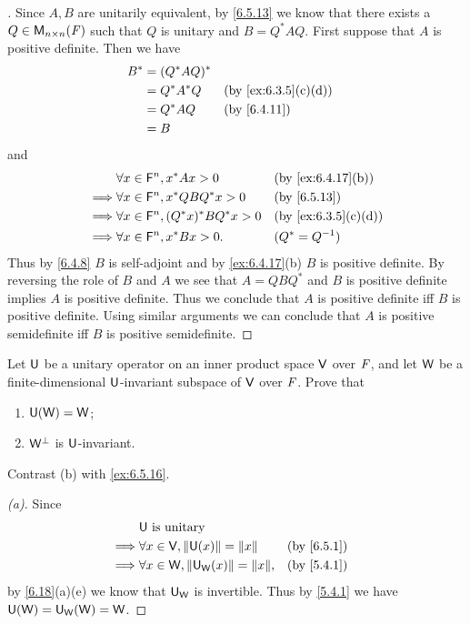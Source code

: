 \begin{proof}[]
  Since \(A, B\) are unitarily equivalent, by \cref{6.5.13} we know that there exists a \(Q \in \ms[n][n][\F]\) such that \(Q\) is unitary and \(B = Q^* A Q\).
  First suppose that \(A\) is positive definite.
  Then we have
  \begin{align*}
    B^* & = (Q^* A Q)^*                         \\
        & = Q^* A^* Q   &  & \by{ex:6.3.5}[c,d] \\
        & = Q^* A Q     &  & \by{6.4.11}        \\
        & = B
  \end{align*}
  and
  \begin{align*}
             & \forall x \in \vs{F}^n, x^* A x > 0           &  & \by{ex:6.4.17}[b]  \\
    \implies & \forall x \in \vs{F}^n, x^* Q B Q^* x > 0     &  & \by{6.5.13}        \\
    \implies & \forall x \in \vs{F}^n, (Q^* x)^* B Q^* x > 0 &  & \by{ex:6.3.5}[c,d] \\
    \implies & \forall x \in \vs{F}^n, x^* B x > 0.          &  & (Q^* = Q^{-1})
  \end{align*}
  Thus by \cref{6.4.8} \(B\) is self-adjoint and by \cref{ex:6.4.17}(b) \(B\) is positive definite.
  By reversing the role of \(B\) and \(A\) we see that \(A = Q B Q^*\) and \(B\) is positive definite implies \(A\) is positive definite.
  Thus we conclude that \(A\) is positive definite iff \(B\) is positive definite.
  Using similar arguments we can conclude that \(A\) is positive semidefinite iff \(B\) is positive semidefinite.
\end{proof}

\begin{ex}\label{ex:6.5.15}
  Let \(\mathsf{U}\) be a unitary operator on an inner product space \(\mathsf{V}\) over \(\mathit{F}\), and let \(\mathsf{W}\) be a finite-dimensional \(\mathsf{U}\)-invariant subspace of \(\mathsf{V}\) over \(\mathit{F}\).
  Prove that
  \begin{enumerate}
    \item \(\mathsf{U}(\mathsf{W}) = \mathsf{W}\);
    \item \(\mathsf{W}^{\perp}\) is \(\mathsf{U}\)-invariant.
  \end{enumerate}
  Contrast (b) with \cref{ex:6.5.16}.
\end{ex}

\begin{proof}[(a)]
  Since
  \begin{align*}
             & \U \text{ is unitary}                                           \\
    \implies & \forall x \in \V, \norm{\U(x)} = \norm{x}       &  & \by{6.5.1} \\
    \implies & \forall x \in \W, \norm{\U_{\W}(x)} = \norm{x}, &  & \by{5.4.1}
  \end{align*}
  by \cref{6.18}(a)(e) we know that \(\mathsf{U}_{\mathsf{W}}\) is invertible.
  Thus by \cref{5.4.1} we have \(\mathsf{U}(\mathsf{W}) = \mathsf{U}_{\mathsf{W}}(\mathsf{W}) = \mathsf{W}\).
\end{proof}

